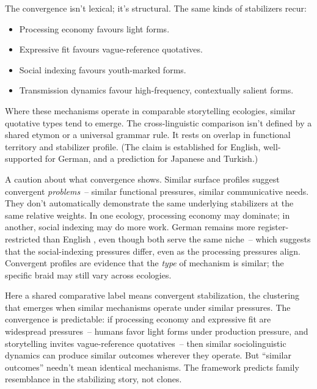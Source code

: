 The convergence isn't lexical; it's structural. The same kinds of stabilizers recur:

\begin{itemize}
   \item Processing economy favours light forms.
   \item Expressive fit favours vague-reference quotatives.
   \item Social indexing favours youth-marked forms.
   \item Transmission dynamics favour high-frequency, contextually salient forms.
\end{itemize}

Where these mechanisms operate in comparable storytelling ecologies, similar quotative types tend to emerge. The cross-linguistic comparison isn't defined by a shared etymon or a universal grammar rule. It rests on overlap in functional territory and stabilizer profile. (The claim is established for English, well-supported for German, and a prediction for Japanese and Turkish.)

A caution about what convergence shows. Similar surface profiles suggest convergent \emph{problems}~-- similar functional pressures, similar communicative needs. They don't automatically demonstrate the same underlying stabilizers at the same relative weights. In one ecology, processing economy may dominate; in another, social indexing may do more work. German  remains more register-restricted than English , even though both serve the same niche~-- which suggests that the social-indexing pressures differ, even as the processing pressures align. Convergent profiles are evidence that the \emph{type} of mechanism is similar; the specific braid may still vary across ecologies.

Here a shared comparative label means convergent stabilization, the clustering that emerges when similar mechanisms operate under similar pressures. The convergence is predictable: if processing economy and expressive fit are widespread pressures~-- humans favor light forms under production pressure, and storytelling invites vague-reference quotatives~-- then similar sociolinguistic dynamics can produce similar outcomes wherever they operate. But \enquote{similar outcomes} needn't mean identical mechanisms. The framework predicts family resemblance in the stabilizing story, not clones.


